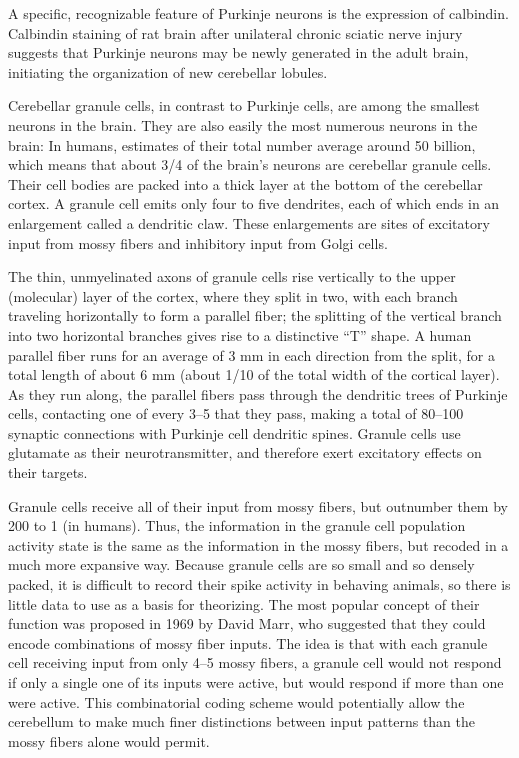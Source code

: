 A specific, recognizable feature of Purkinje neurons is the expression of calbindin. Calbindin staining of rat brain after unilateral chronic sciatic nerve injury suggests that Purkinje neurons may be newly generated in the adult brain, initiating the organization of new cerebellar lobules.

Cerebellar granule cells, in contrast to Purkinje cells, are among the smallest neurons in the brain. They are also easily the most numerous neurons in the brain: In humans, estimates of their total number average around 50 billion, which means that about 3/4 of the brain's neurons are cerebellar granule cells. Their cell bodies are packed into a thick layer at the bottom of the cerebellar cortex. A granule cell emits only four to five dendrites, each of which ends in an enlargement called a dendritic claw. These enlargements are sites of excitatory input from mossy fibers and inhibitory input from Golgi cells.

The thin, unmyelinated axons of granule cells rise vertically to the upper (molecular) layer of the cortex, where they split in two, with each branch traveling horizontally to form a parallel fiber; the splitting of the vertical branch into two horizontal branches gives rise to a distinctive ``T'' shape. A human parallel fiber runs for an average of 3 mm in each direction from the split, for a total length of about 6 mm (about 1/10 of the total width of the cortical layer). As they run along, the parallel fibers pass through the dendritic trees of Purkinje cells, contacting one of every 3--5 that they pass, making a total of 80--100 synaptic connections with Purkinje cell dendritic spines. Granule cells use glutamate as their neurotransmitter, and therefore exert excitatory effects on their targets.

Granule cells receive all of their input from mossy fibers, but outnumber them by 200 to 1 (in humans). Thus, the information in the granule cell population activity state is the same as the information in the mossy fibers, but recoded in a much more expansive way. Because granule cells are so small and so densely packed, it is difficult to record their spike activity in behaving animals, so there is little data to use as a basis for theorizing. The most popular concept of their function was proposed in 1969 by David Marr, who suggested that they could encode combinations of mossy fiber inputs. The idea is that with each granule cell receiving input from only 4--5 mossy fibers, a granule cell would not respond if only a single one of its inputs were active, but would respond if more than one were active. This combinatorial coding scheme would potentially allow the cerebellum to make much finer distinctions between input patterns than the mossy fibers alone would permit.

